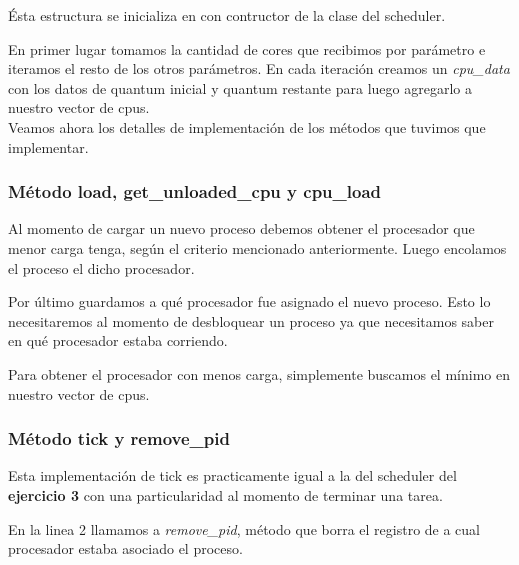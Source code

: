 \documentclass[a4paper,11pt]{article}
\begin{document}
			Ésta estructura se inicializa en con contructor de la clase del scheduler.

			

			En primer lugar tomamos la cantidad de cores que recibimos por parámetro e iteramos el resto de los otros parámetros. En cada iteración creamos un \textit{cpu\_data} con los datos de quantum inicial y quantum restante para luego agregarlo a nuestro vector de cpus.\\
			
			Veamos ahora los detalles de implementación de los métodos que tuvimos que implementar.
			
		\subsubsection*{Método load, get\_unloaded\_cpu y cpu\_load}
			Al momento de cargar un nuevo proceso debemos obtener el procesador que menor carga tenga, según el criterio mencionado anteriormente. Luego encolamos el proceso el dicho procesador.
	
						
			
			Por último guardamos a qué procesador fue asignado el nuevo proceso. Esto lo necesitaremos al momento de desbloquear un proceso ya que necesitamos saber en qué procesador estaba corriendo.
			
			Para obtener el procesador con menos carga, simplemente buscamos el mínimo en nuestro vector de cpus.
	
			
			
		\subsubsection*{Método tick y remove\_pid}
			Esta implementación de tick es practicamente igual a la del scheduler del \textbf{ejercicio 3} con una particularidad al momento de terminar una tarea.
	
			
			
			En la linea 2 llamamos a \textit{remove\_pid}, método que borra el registro de a cual procesador estaba asociado el proceso.
\end{document}
